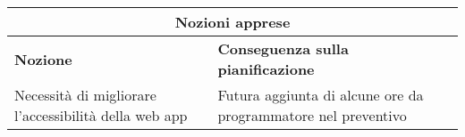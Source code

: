 \documentclass[a4paper, 12pt]{article}
\begin{document}
\begin{center}
    \begin{tabularx}{\textwidth}{|X|X|}
        \hline
        \multicolumn{2}{|c|}{\textbf{Nozioni apprese}}\\
        \hline
        \hline
        \textbf{Nozione} & \textbf{Conseguenza sulla pianificazione}\\
        \hline
        Necessità di migliorare l'accessibilità della web app & Futura aggiunta di alcune ore da programmatore nel preventivo \\
        \hline
    \end{tabularx}\\[8pt]
    \mbox{}\\
\end{center}
\end{document}

